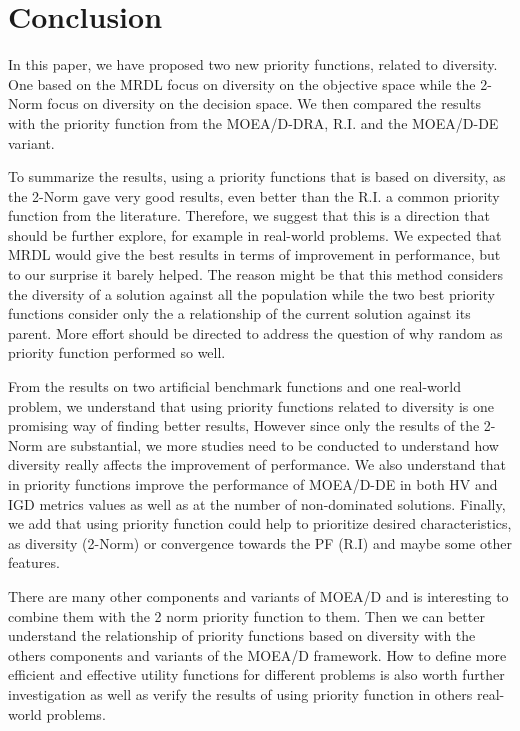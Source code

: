 \section{Conclusion}

In this paper, we have proposed two new priority functions, related to diversity. One based on the MRDL focus on diversity on the objective space while the 2-Norm focus on diversity on the decision space. We then compared the results with the priority function from the MOEA/D-DRA, R.I. and the MOEA/D-DE variant. 

To summarize the results, using a priority functions that is based on diversity, as the 2-Norm gave very good results, even better than the R.I. a common priority function from the literature. Therefore, we suggest that this is a direction that should be further explore, for example in real-world problems. We expected that MRDL would give the best results in terms of improvement in performance, but to our surprise it barely helped. The reason might be that this method considers the diversity of a solution against all the population while the two best priority functions consider only the a relationship of the current solution against its parent. More effort should be directed to address the question of why random as priority function performed so well.

From the results on two artificial benchmark functions and one real-world problem, we understand that using priority functions related to diversity is one promising way of finding better results, However since only the results of the 2-Norm are substantial, we more studies need to be conducted to understand how diversity really affects the improvement of performance. We also understand that in priority functions improve the performance of MOEA/D-DE in both HV and IGD metrics values as well as at the number of non-dominated solutions. Finally, we add that using priority function could help to prioritize desired characteristics, as diversity (2-Norm) or convergence towards the PF (R.I) and maybe some other features.

There are many other components and variants of MOEA/D and is interesting to combine them with the 2 norm priority function to them. Then we can better understand the relationship of priority functions based on diversity with the others components and variants of the MOEA/D framework. How to define more efficient and effective utility functions for different problems is also worth further investigation as well as verify the results of using priority function in others real-world problems.